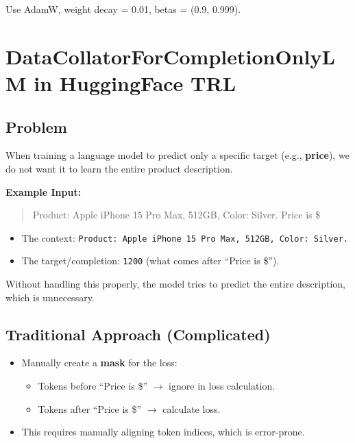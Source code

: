 \begin{tcolorbox}[colback=red!5,colframe=red!70!black,title=Rule of Thumb]
Use AdamW, weight decay = 0.01, betas = (0.9, 0.999).
\end{tcolorbox}

\newpage
\section{DataCollatorForCompletionOnlyLM in HuggingFace TRL}

\subsection{Problem}
When training a language model to predict only a specific target (e.g., \textbf{price}), we do not want it to learn the entire product description.

\textbf{Example Input:}  
\begin{quote}
Product: Apple iPhone 15 Pro Max, 512GB, Color: Silver. Price is \$
\end{quote}

\begin{itemize}
    \item The context: \texttt{Product: Apple iPhone 15 Pro Max, 512GB, Color: Silver.}  
    \item The target/completion: \texttt{1200} (what comes after ``Price is \$'').
\end{itemize}

Without handling this properly, the model tries to predict the entire description, which is unnecessary.

\subsection{Traditional Approach (Complicated)}
\begin{itemize}
    \item Manually create a \textbf{mask} for the loss:
    \begin{itemize}
        \item Tokens before ``Price is \$'' $\rightarrow$ ignore in loss calculation.
        \item Tokens after ``Price is \$'' $\rightarrow$ calculate loss.
    \end{itemize}
    \item This requires manually aligning token indices, which is error-prone.
\end{itemize}


